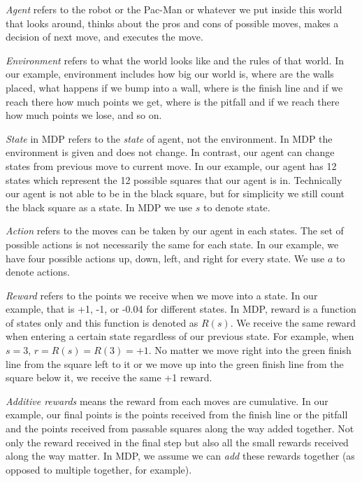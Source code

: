 \documentclass[
	letterpaper
]{article}
\begin{document}
\textit{Agent} refers to the robot or the Pac-Man or whatever we put inside this world that looks around, thinks about the pros and cons of possible moves, makes a decision of next move, and executes the move.

\textit{Environment} refers to what the world looks like and the rules of that world. In our example, environment includes how big our world is, where are the walls placed, what happens if we bump into a wall, where is the finish line and if we reach there how much points we get, where is the pitfall and if we reach there how much points we lose, and so on.

\textit{State} in MDP refers to the \textit{state} of agent, not the environment. In MDP the environment is given and does not change. In contrast, our agent can change states from previous move to current move. In our example, our agent has 12 states which represent the 12 possible squares that our agent is in. Technically our agent is not able to be in the black square, but for simplicity we still count the black square as a state. In MDP we use $s$ to denote state.

\textit{Action} refers to the moves can be taken by our agent in each states. The set of possible actions is not necessarily the same for each state. In our example, we have four possible actions up, down, left, and right for every state. We use $a$ to denote actions.

\textit{Reward} refers to the points we receive when we move into a state. In our example, that is +1, -1, or -0.04 for different states. In MDP, reward is a function of states only and this function is denoted as $R(s)$. We receive the same reward when entering a certain state regardless of our previous state. For example, when $s = 3$, $r = R(s) =R(3)= +1$. No matter we move right into the green finish line from the square left to it or we move up into the green finish line from the square below it, we receive the same +1 reward.

\textit{Additive rewards} means the reward from each moves are cumulative.
In our example, our final points is the points received from the finish line or the pitfall and the points received from passable squares along the way added together. Not only the reward received in the final step but also all the small rewards received along the way matter. In MDP, we assume we can \textit{add} these rewards together (as opposed to multiple together, for example).
\end{document}
